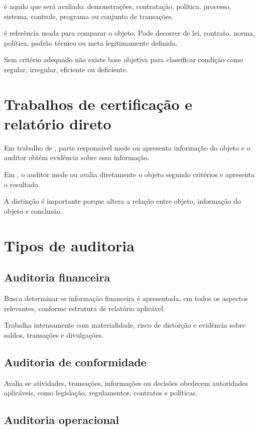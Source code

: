  é aquilo que será avaliado: demonstrações, contratação, política, processo, sistema, controle, programa ou conjunto de transações.

 é referência usada para comparar o objeto. Pode decorrer de lei, contrato, norma, política, padrão técnico ou meta legitimamente definida.

Sem critério adequado não existe base objetiva para classificar condição como regular, irregular, eficiente ou deficiente.

\section{Trabalhos de certificação e relatório direto}

Em trabalho de , parte responsável mede ou apresenta informação do objeto e o auditor obtém evidência sobre essa informação.

Em , o auditor mede ou avalia diretamente o objeto segundo critérios e apresenta o resultado.

A distinção é importante porque altera a relação entre objeto, informação do objeto e conclusão.

\section{Tipos de auditoria}

\subsection{Auditoria financeira}

Busca determinar se informação financeira é apresentada, em todos os aspectos relevantes, conforme estrutura de relatório aplicável.

Trabalha intensamente com materialidade, risco de distorção e evidência sobre saldos, transações e divulgações.

\subsection{Auditoria de conformidade}

Avalia se atividades, transações, informações ou decisões obedecem autoridades aplicáveis, como legislação, regulamentos, contratos e políticas.

\subsection{Auditoria operacional}

